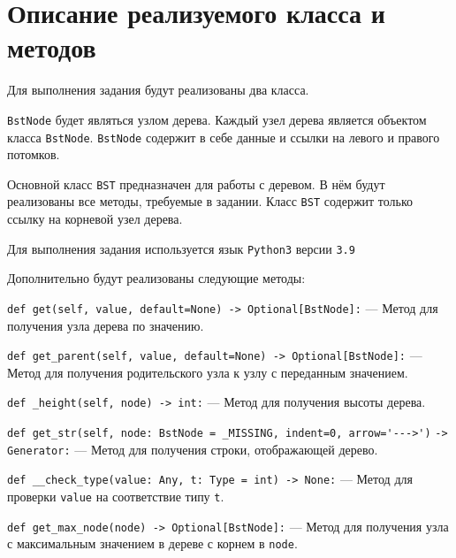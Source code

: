\section*{Описание реализуемого класса и методов}

Для выполнения задания будут реализованы два класса.

\verb|BstNode| будет являться узлом дерева.
Каждый узел дерева является объектом класса \verb|BstNode|.
\verb|BstNode| содержит в себе данные и ссылки на левого и правого потомков.

Основной класс \verb|BST| предназначен для работы с деревом.
В нём будут реализованы все методы, требуемые в задании.
Класс \verb|BST| содержит только ссылку на корневой узел дерева.

Для выполнения задания используется язык \verb|Python3| версии \verb|3.9|

Дополнительно будут реализованы следующие методы:

\verb|def get(self, value, default=None) -> Optional[BstNode]:| ---
Метод для получения узла дерева по значению.

\verb|def get_parent(self, value, default=None) -> Optional[BstNode]:| ---
Метод для получения родительского узла к узлу с переданным значением.

\verb|def _height(self, node) -> int:| ---
Метод для получения высоты дерева.

\verb|def get_str(self, node: BstNode = _MISSING, indent=0, arrow='--->')|
\verb|-> Generator:| ---
Метод для получения строки, отображающей дерево.

\verb|def __check_type(value: Any, t: Type = int) -> None:| ---
Метод для проверки \verb|value| на соответствие типу \verb|t|.

\verb|def get_max_node(node) -> Optional[BstNode]:| ---
Метод для получения узла с максимальным значением в дереве с корнем в \verb|node|.